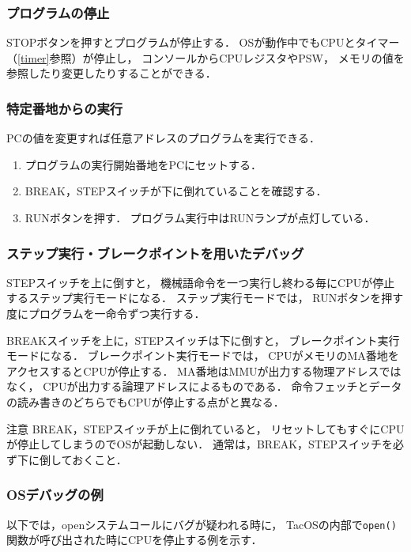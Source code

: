 \subsubsection{プログラムの停止}
STOPボタンを押すとプログラムが停止する．
OSが動作中でもCPUとタイマー（\ref{timer}参照）が停止し，
コンソールからCPUレジスタやPSW，
メモリの値を参照したり変更したりすることができる．

\subsubsection{特定番地からの実行}
PCの値を変更すれば任意アドレスのプログラムを実行できる．

\begin{enumerate}
\item プログラムの実行開始番地をPCにセットする．
\item BREAK，STEPスイッチが下に倒れていることを確認する．
\item RUNボタンを押す．
  プログラム実行中はRUNランプが点灯している．
\end{enumerate}

\subsubsection{ステップ実行・ブレークポイントを用いたデバッグ}
STEPスイッチを上に倒すと，
機械語命令を一つ実行し終わる毎にCPUが停止するステップ実行モードになる．
ステップ実行モードでは，
RUNボタンを押す度にプログラムを一命令ずつ実行する．

BREAKスイッチを上に，STEPスイッチは下に倒すと，
ブレークポイント実行モードになる．
ブレークポイント実行モードでは，
CPUがメモリのMA番地をアクセスするとCPUが停止する．
MA番地はMMUが出力する物理アドレスではなく，
CPUが出力する論理アドレスによるものである．
命令フェッチとデータの読み書きのどちらでもCPUが停止する点が{\tec}と異なる．

\begin{itembox}[l]{注意}
  BREAK，STEPスイッチが上に倒れていると，
  リセットしてもすぐにCPUが停止してしまうのでOSが起動しない．
  通常は，BREAK，STEPスイッチを必ず下に倒しておくこと．
\end{itembox}

\subsubsection{OSデバッグの例}
以下では，openシステムコールにバグが疑われる時に，
TacOSの内部で\texttt{open()}関数が呼び出された時にCPUを停止する例を示す．

